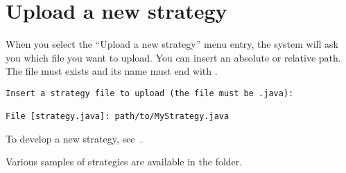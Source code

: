 \section{Upload a new strategy}\label{sec:upload}

When you select the ``Upload a new strategy'' menu entry, the system will ask
you which file you want to upload. You can insert an absolute or relative path.
The file must exists and its name must end with .

\begin{verbatim}
Insert a strategy file to upload (the file must be .java):

File [strategy.java]: path/to/MyStrategy.java
\end{verbatim}

To develop a new strategy, see~.

Various samples of strategies are available in the  folder.
